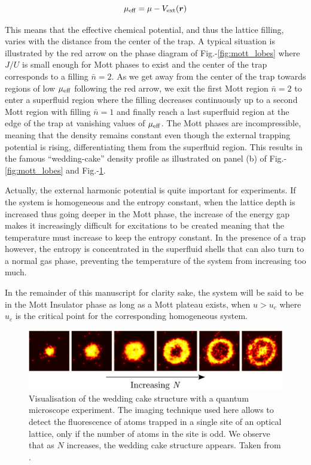 \begin{equation}
    \mu_{\rm{eff}}= \mu - V_{\rm{ext}}(\bm{r})
\end{equation}

\noindent This means that the effective chemical potential, and thus the lattice filling, varies with the distance from the center of the trap. A typical situation is illustrated by the red arrow on the phase diagram of Fig.-\ref{fig:mott_lobes} where $J/U$ is small enough for Mott phases to exist and the center of the trap corresponds to a filling $\bar{n}=2$. As we get away from the center of the trap towards regions of low $\mu_{\rm{eff}}$ following the red arrow, we exit the first Mott region $\bar{n}=2$ to enter a superfluid region where the filling decreases continuously up to a second Mott region with filling $\bar{n}=1$ and finally reach a last superfluid region at the edge of the trap at vanishing values of $\mu_{\rm{eff}}$. The Mott phases are incompressible, meaning that the density remains constant even though the external trapping potential is rising, differentiating them from the superfluid region. This results in the famous ``wedding-cake'' density profile as illustrated on panel (b) of Fig.-\ref{fig:mott_lobes} and Fig.-\ref{fig:sherson}.

Actually, the external harmonic potential is quite important for experiments. If the system is homogeneous and the entropy constant, when the lattice depth is increased thus going deeper in the Mott phase, the increase of the energy gap makes it increasingly difficult for excitations to be created meaning that the temperature must increase to keep the entropy constant. In the presence of a trap however, the entropy is concentrated in the superfluid shells that can also turn to a normal gas phase, preventing the temperature of the system from increasing too much.

In the remainder of this manuscript for clarity sake, the system will be said to be in the Mott Insulator phase as long as a Mott plateau exists, \ie when $u > u_c$ where $u_c$ is the critical point for the corresponding homogeneous system.

\begin{figure}
    \centering
    \includegraphics[width=\textwidth]{Fig/Chapter2/wedding_cake_sherson.png}
    \caption[Visualisation of the wedding cake structure with a quantum microscope experiment]{Visualisation of the wedding cake structure with a quantum microscope experiment. The imaging technique used here allows to detect the fluorescence of atoms trapped in a single site of an optical lattice, only if the number of atoms in the site is odd. We observe that as $N$ increases, the wedding cake structure appears. Taken from \cite{sherson2010single}.}
    \label{fig:sherson}
\end{figure}

